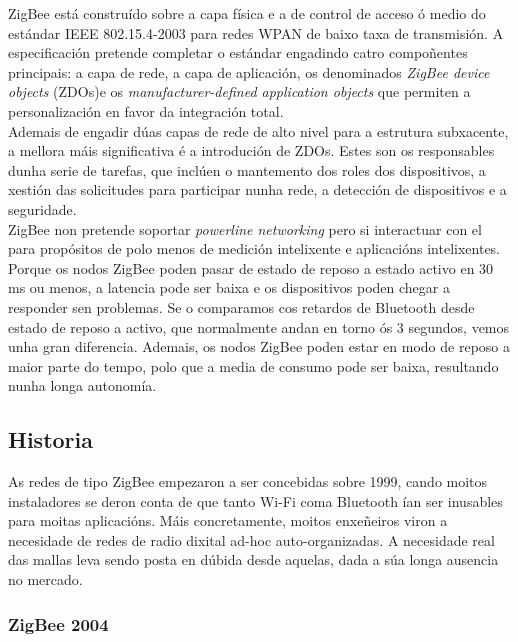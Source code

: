  ZigBee está construído sobre a capa física e a de control de acceso ó medio do
 estándar IEEE 802.15.4-2003 para redes WPAN de baixo taxa de transmisión. A
 especificación pretende completar o estándar engadindo catro compoñentes
 principais: a capa de rede, a capa de aplicación, os denominados
 \textit{ZigBee device objects} (ZDOs)e os
 \textit{manufacturer-defined application objects} que permiten a
 personalización en favor da integración total. \\

 Ademais de engadir dúas capas de rede de alto nivel para a estrutura
 subxacente, a mellora máis significativa é a introdución de ZDOs. Estes son
 os responsables dunha serie de tarefas, que inclúen o mantemento dos roles dos
 dispositivos, a xestión das solicitudes para participar nunha rede, a
 detección de dispositivos e a seguridade. \\

 ZigBee non pretende soportar \textit{powerline networking} pero si interactuar
 con el para propósitos de polo menos de medición intelixente e aplicacións
 intelixentes. \\

 Porque os nodos ZigBee poden pasar de estado de reposo a estado activo en
 30 ms ou menos, a latencia pode ser baixa e os dispositivos poden chegar a
 responder sen problemas. Se o comparamos cos retardos de Bluetooth desde
 estado de reposo a activo, que normalmente andan en torno ós 3 segundos, vemos
 unha gran diferencia. Ademais, os nodos ZigBee poden estar en modo de reposo a
 maior parte do tempo, polo que a media de consumo pode ser baixa, resultando
 nunha longa autonomía.

 \subsection{Historia}

 As redes de tipo ZigBee empezaron a ser concebidas sobre 1999, cando moitos
 instaladores se deron conta de que tanto Wi-Fi coma Bluetooth ían ser
 inusables para moitas aplicacións. Máis concretamente, moitos enxeñeiros viron
 a necesidade de redes de radio dixital ad-hoc auto-organizadas. A necesidade
 real das mallas leva sendo posta en dúbida desde aquelas, dada a súa longa
 ausencia no mercado.

  \subsubsection{ZigBee 2004}

